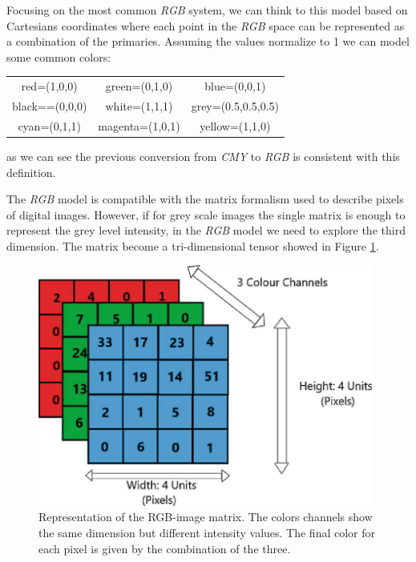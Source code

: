 \documentclass[../main.tex]{subfiles}
\begin{document}
Focusing on the most common \textit{RGB} system,  we can think to this model based on Cartesians coordinates where each point in the  \textit{RGB} space can be represented as a combination of the primaries. Assuming the values normalize to 1 we can model some common colors:

\begin{center}
\begin{tabular}{ c c c }
 red=(1,0,0) & green=(0,1,0) & blue=(0,0,1) \\ 
 black==(0,0,0) & white=(1,1,1) & grey=(0.5,0.5,0.5) \\  
 cyan=(0,1,1) & magenta=(1,0,1) & yellow=(1,1,0)    
\end{tabular}
\end{center}

as we can see the previous conversion from \textit{CMY} to \textit{RGB} is consistent with this definition.

The \textit{RGB} model is compatible with the matrix formalism used to describe pixels of digital images. However, if for grey scale images the single matrix is enough to represent the grey level intensity, in the \textit{RGB} model we need to explore the third dimension. The matrix become a tri-dimensional tensor showed in Figure \ref{fig:rgb}.

\begin{figure}[H] 
\begin{center}
\includegraphics[width=11cm]{images/rgb.png}
\caption{\small{Representation of the RGB-image matrix. The colors channels show the same dimension but different intensity values. The final color for each pixel is given by the combination of the three.}}\label{fig:rgb}
\end{center}
\end{figure}
\end{document}
